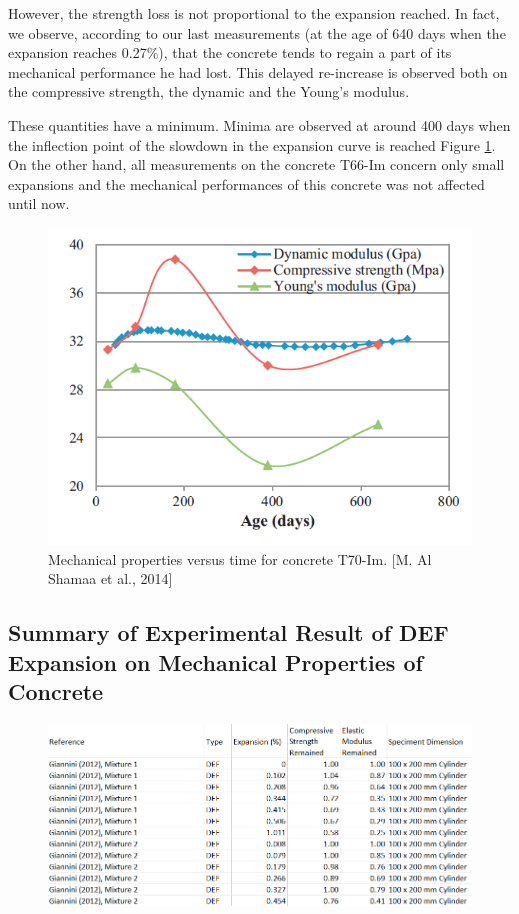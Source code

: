 However, the strength loss is not proportional to the expansion reached. In fact, we observe, according to our last measurements (at the age of 640 days when the expansion reaches 0.27\%), that the concrete tends to regain a part of its mechanical performance he had lost. This delayed re-increase is observed both on the compressive strength, the dynamic and the Young’s modulus.

These quantities have a minimum. Minima are observed at around 400 days when the inflection point of the slowdown in the expansion curve is reached Figure \ref{Shamaa_4}. On the other hand, all measurements on the concrete T66-Im concern only small expansions and the mechanical performances of this concrete was not affected until now.

\begin{figure}[h!]
  \centering
  \includegraphics[width=0.8\linewidth]{Reference/Shamaa4.png}
  \caption{Mechanical properties versus time for concrete T70-Im. [M. Al Shamaa et al., 2014\cite{Shamaa}]}
  \label{Shamaa_4}
\end{figure}

\clearpage
\subsection{Summary of Experimental Result of DEF Expansion on Mechanical Properties of Concrete}

\begin{figure}[h!]
  \centering
  \includegraphics[width=1.0\linewidth]{Reference/GIANNINIDEFdata.png}
\end{figure}

